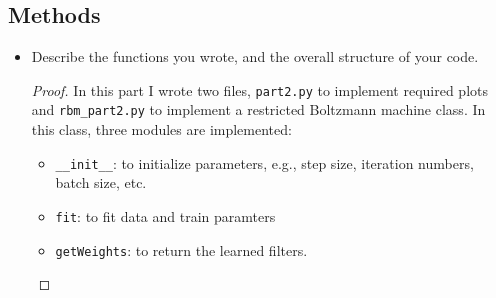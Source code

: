 \documentclass[12pt]{article}
\newcommand{\1}{\mathbf{1}}
\begin{document}
{\subsection{Methods}
\begin{itemize}
  \item Describe the functions you wrote, and the overall structure of your code.
  \begin{proof}
    In this part I wrote two files, {\tt part2.py} to implement required plots and {\tt rbm\_part2.py} to implement a restricted Boltzmann machine class. In this class, three modules are implemented:
    \begin{itemize}
      \item {\tt \_\_init\_\_}: to initialize parameters, e.g., step size, iteration numbers, batch size, etc.
      \item {\tt fit}: to fit data and train paramters
      \item {\tt getWeights}: to return the learned filters.
    \end{itemize}
  \end{proof}
\end{itemize}

}
\end{document}
